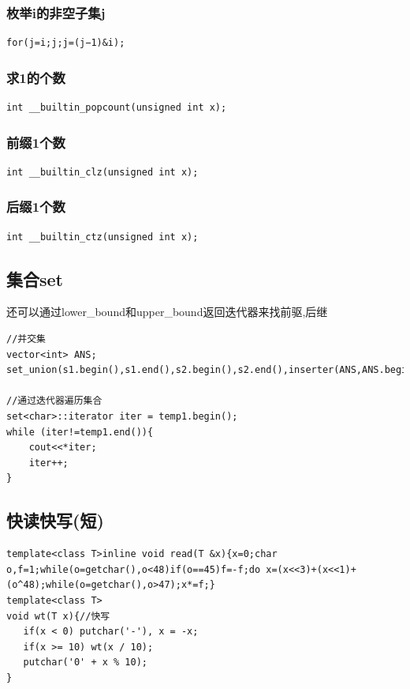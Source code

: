 \documentclass[a4]{ctexart}
\begin{document}
\subsubsection{枚举i的非空子集j}
\begin{lstlisting}
for(j=i;j;j=(j−1)&i);
\end{lstlisting}

\subsubsection{求1的个数}
\begin{lstlisting}
int __builtin_popcount(unsigned int x);
\end{lstlisting}

\subsubsection{前缀1个数}
\begin{lstlisting}
int __builtin_clz(unsigned int x);
\end{lstlisting}

\subsubsection{后缀1个数}
\begin{lstlisting}
int __builtin_ctz(unsigned int x);
\end{lstlisting}

\subsection{集合set}
还可以通过lower\_bound和upper\_bound返回迭代器来找前驱,后继
\begin{lstlisting}
//并交集
vector<int> ANS;
set_union(s1.begin(),s1.end(),s2.begin(),s2.end(),inserter(ANS,ANS.begin()));//set_intersection()

//通过迭代器遍历集合
set<char>::iterator iter = temp1.begin();
while (iter!=temp1.end()){
	cout<<*iter;
	iter++;
}
\end{lstlisting}

\subsection{快读快写(短)}
\begin{lstlisting}
template<class T>inline void read(T &x){x=0;char o,f=1;while(o=getchar(),o<48)if(o==45)f=-f;do x=(x<<3)+(x<<1)+(o^48);while(o=getchar(),o>47);x*=f;}
template<class T>
void wt(T x){//快写
   if(x < 0) putchar('-'), x = -x;
   if(x >= 10) wt(x / 10);
   putchar('0' + x % 10);
}
\end{lstlisting}
\end{document}

